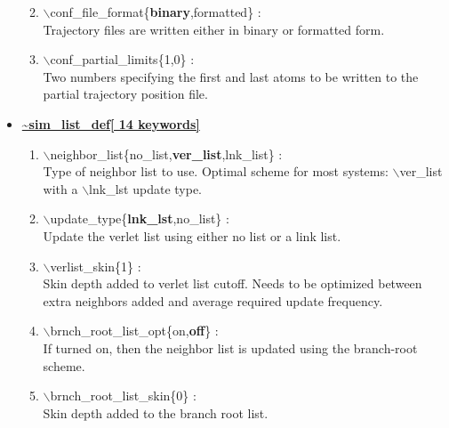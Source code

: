 \begin{itemize}
\begin{enumerate}
 \vspace{0.15in} \Large
 \item   $\backslash$conf\_file\_format\{{\bf binary},formatted\} : \\
   \large
   Trajectory files are written either in binary or formatted form.

 \vspace{0.15in} \Large
 \item   $\backslash$conf\_partial\_limits\{1,0\} : \\
   \large
   Two numbers specifying the first and last atoms to be written to
   the partial trajectory position file.

\end{enumerate}

\clearpage
\huge
\item[] \underline{\bf \~{}sim\_list\_def[ 14 keywords]}
\begin{enumerate}

 \vspace{0.15in} \Large
 \item   $\backslash$neighbor\_list\{no\_list,{\bf ver\_list},lnk\_list\} : \\
   \large
   Type of neighbor list to use.  Optimal scheme for most systems: 
   $\backslash$ver\_list with a $\backslash$lnk\_lst update type.

 \vspace{0.15in} \Large
 \item   $\backslash$update\_type\{{\bf lnk\_lst},no\_list\} : \\
   \large
   Update the verlet list using either no list or a link list.

 \vspace{0.15in} \Large
 \item   $\backslash$verlist\_skin\{1\} : \\
   \large
   Skin depth added to verlet list cutoff.  Needs to be optimized between
   extra neighbors added and average required update frequency.

 \vspace{0.15in} \Large
 \item   $\backslash$brnch\_root\_list\_opt\{on,{\bf off}\} : \\
   \large
    If turned on, then the neighbor list is updated using the branch-root 
    scheme.

 \vspace{0.15in} \Large
 \item   $\backslash$brnch\_root\_list\_skin\{0\} : \\
   \large
   Skin depth added to the branch root list.


\end{enumerate}
\end{itemize}
